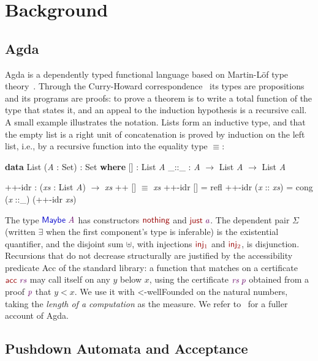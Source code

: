 \documentclass[runningheads]{llncs}
\newcommand{\blueFG}[1]{\textcolor[rgb]{0,0,0.8}{#1}}
\newcommand{\redFG}[1]{\textcolor[rgb]{0.6,0,0}{#1}}
\newcommand{\greenFG}[1]{\textcolor[rgb]{0,0.4,0}{#1}}
\newcommand{\purpleFG}[1]{\textcolor[rgb]{0.4,0,0.4}{#1}}
\newcommand{\D}[1]{{\blueFG{\textsf{#1}}}}      %
\newcommand{\Con}[1]{{\redFG{\textsf{#1}}}}     %
\newcommand{\F}[1]{{\greenFG{\textsf{#1}}}}     %
\newcommand{\V}[1]{{\purpleFG{\textit{#1}}}}    %
\newcommand{\Kw}[1]{\textbf{#1}}                %
\newcommand{\kto}{\ensuremath{\to}}
\newcommand{\kuplus}{\ensuremath{\uplus}}
\newcommand{\keq}{\ensuremath{\equiv}}
\newcommand{\ks}[1]{\ensuremath{_{#1}}}
\newcommand{\kSigma}{\ensuremath{\Sigma}}
\begin{document}
\section{Background}\label{sec:setup}

\subsection{Agda}

Agda is a dependently typed functional language based on Martin-L\"{o}f type
theory~\cite{Lof84}. Through the Curry-Howard correspondence~\cite{Howard80}
its types are propositions and its programs are proofs: to prove a theorem is to
write a total function of the type that states it, and an appeal to the
induction hypothesis is a recursive call. A small example illustrates the
notation. Lists form an inductive type, and that the empty list is a right unit
of concatenation is proved by induction on the left list, i.e., by a recursive
function into the equality type $\keq$:
\begin{spec}
\Kw{data} \D{List} (\V{A} : \D{Set}) : \D{Set} \Kw{where}
   \Con{[]}   : \D{List} \V{A}
   \Con{\_::\_} : \V{A} \kto{} \D{List} \V{A} \kto{} \D{List} \V{A}

\F{++-idr} : (\V{xs} : \D{List} \V{A}) \kto{} \V{xs} \F{++} \Con{[]} \keq{} \V{xs}
\F{++-idr} \Con{[]} = \Con{refl}
\F{++-idr} (\V{x} :: \V{xs}) = \F{cong} (\V{x} ::\_) (\F{++-idr} \V{xs})
\end{spec}
The type $\D{Maybe}\;\V{A}$ has constructors $\Con{nothing}$ and
$\Con{just}\;\V{a}$. The dependent pair $\kSigma$ (written $\exists$ when the
first component's type is inferable) is the existential quantifier, and the
disjoint sum $\kuplus$, with injections $\Con{inj\ks{1}}$ and
$\Con{inj\ks{2}}$, is disjunction. Recursions that do not decrease structurally
are justified by the accessibility predicate \D{Acc} of the standard library: a
function that matches on a certificate $\Con{acc}\;\V{rs}$ may call itself on any
$y$ below $x$, using the certificate $\V{rs}\;\V{p}$ obtained from a proof
$\V{p}$ that $y < x$. We use it with \F{<-wellFounded} on the natural numbers,
taking the \emph{length of a computation} as the measure. We refer
to~\cite{Wadler22} for a fuller account of Agda.

\subsection{Pushdown Automata and Acceptance}\label{sec:pda}
\end{document}
